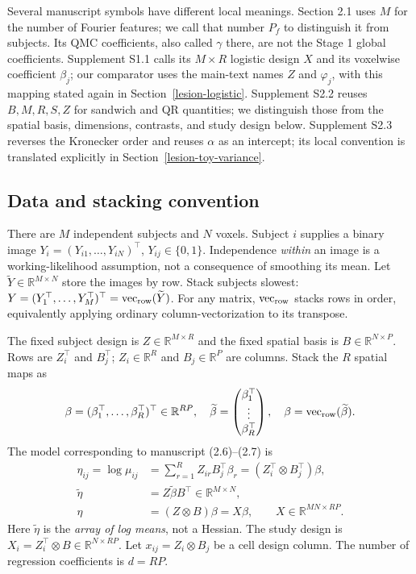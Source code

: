 \documentclass[11pt,a4paper]{article}
\newcommand{\R}{\mathbb R}
\newcommand{\vr}{\operatorname{vec}_{\rm row}}
\numberwithin{equation}{section}
\begin{document}
Several manuscript symbols have different local meanings.
Section 2.1 uses $M$ for the number of Fourier features; we call
that number $P_f$ to distinguish it from subjects.
Its QMC coefficients, also called $\gamma$ there, are not the
Stage 1 global coefficients.
Supplement S1.1 calls its $M\times R$ logistic design $X$ and
its voxelwise coefficient $\beta_j$; our comparator uses the
main-text names $Z$ and $\varphi_j$, with this mapping stated again
in Section~\ref{lesion-logistic}.
Supplement S2.2 reuses $B,M,R,S,Z$ for sandwich and QR quantities;
we distinguish those from the spatial basis, dimensions, contrasts,
and study design below.
Supplement S2.3 reverses the Kronecker order and reuses $\alpha$
as an intercept; its local convention is translated explicitly in
Section~\ref{lesion-toy-variance}.

\subsection{Data and stacking convention}
There are $M$ independent subjects and $N$ voxels.
Subject $i$ supplies a binary image
$Y_i=(Y_{i1},\ldots,Y_{iN})^\top$, $Y_{ij}\in\{0,1\}$.
Independence \emph{within} an image is a working-likelihood assumption,
not a consequence of smoothing its mean.
Let $\widetilde Y\in\R^{M\times N}$ store the images by row.
Stack subjects slowest:
$Y=(Y_1^\top,\ldots,Y_M^\top)^\top=\vr(\widetilde Y)$.
For any matrix, $\vr$ stacks rows in order, equivalently applying
ordinary column-vectorization to its transpose.

The fixed subject design is $Z\in\R^{M\times R}$ and the fixed
spatial basis is $B\in\R^{N\times P}$.
Rows are $Z_i^\top$ and $B_j^\top$; $Z_i\in\R^R$ and $B_j\in\R^P$
are columns. Stack the $R$ spatial maps as
\[
 \beta=(\beta_1^\top,\ldots,\beta_R^\top)^\top\in\R^{RP},
 \quad
 \widetilde\beta=\begin{pmatrix}\beta_1^\top\\ \vdots\\\beta_R^\top\end{pmatrix},
 \quad \beta=\vr(\widetilde\beta).
\]
The model corresponding to manuscript (2.6)--(2.7) is
\begin{align}
 \eta_{ij}=\log\mu_{ij}
 &=\sum_{r=1}^R Z_{ir}B_j^\top\beta_r
   =(Z_i^\top\otimes B_j^\top)\beta,\\
 \widetilde\eta&=Z\widetilde\beta B^\top\in\R^{M\times N},\\
 \eta&=(Z\otimes B)\beta=X\beta,\qquad X\in\R^{MN\times RP}.
 \label{lesion-design}
\end{align}
Here $\widetilde\eta$ is the \emph{array of log means}, not a Hessian.
The study design is $X_i=Z_i^\top\otimes B\in\R^{N\times RP}$.
Let $x_{ij}=Z_i\otimes B_j$ be a cell design column.
The number of regression coefficients is $d=RP$.
\end{document}
